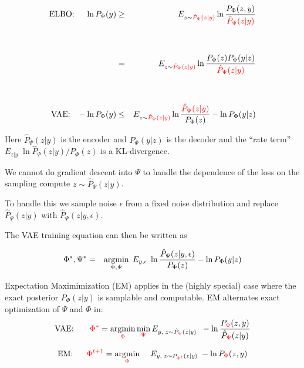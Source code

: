{

{\huge
\begin{eqnarray*}
\mbox{ELBO:}\;\;\;\;\;\ln P_\Phi(y)   &  \geq & E_{z \sim {\color{red} \hat{P}_\Psi(z|y)}} \ln \frac{P_\Phi(z,y)}{{\color{red} \hat{P}_\Psi(z|y)}} \\
  \\
  \\
  & = & E_{z \sim {\color{red} \hat{P}_\Psi(z|y)}} \ln \frac{P_\Phi(z)P_\Phi(y|z)}{{\color{red} \hat{P}_\Psi(z|y)}}\\
  \\
  \\
\mbox{VAE:}\;\;\;- \ln P_\Phi(y)  & \leq & E_{z \sim {\color{red} \hat{P}_\Psi(z|y)}} \ln \frac{{\color{red} \hat{P}_\Psi(z|y)}}{P_\Phi(z)}  - \ln P_\Phi(y|z)
\end{eqnarray*}
}

\vfill
Here $\hat{P}_\Psi(z|y)$ is the encoder and $P_\Phi(y|z)$ is the decoder and the ``rate term'' $ E_{z|y}\;\ln \hat{P}_\Psi(z|y)/P_\Phi(z)$ is a KL-divergence.



We cannot do gradient descent into $\Psi$ to handle the dependence of the loss on the sampling compute $z \sim \hat{P}_\Psi(z|y)$.

\vfill
To handle this we sample noise $\epsilon$ from a fixed noise distribution and replace $\hat{P}_\Psi(z|y)$ with $\hat{P}_\Psi(z|y,\epsilon)$.

\vfill
The VAE training equation can then be written as

\vfill
\begin{eqnarray*}
\Phi^*,\Psi^* & =  & \operatorname*{argmin}_{\Phi,\Psi}\;E_{y,\epsilon}  \;\ln \frac{\hat{P}_\Psi(z|y,\epsilon)}{P_\Phi(z)}  - \ln P_\Phi(y|z)
\end{eqnarray*}



Expectation Maximimization (EM) applies in the (highly special) case where the exact posterior $P_\Phi(z|y)$ is samplable and computable.
EM alternates exact optimization of $\Psi$ and $\Phi$ in:
$$\mbox{VAE:}\;\;\;\;\;\;\; {\color{red} \Phi^*} = \operatorname*{argmin}_{\color{red} \Phi} \min_{\color{red} \Psi} E_{y,\;z \sim \hat{P}_{\color{red} \Psi}(z|y)}\;\;- \ln \frac{P_{\color{red} \Phi}(z,y)}{\hat{P}_{\color{red} \Psi}(z|y)}$$

\vfill
$$\mbox{EM:}\;\;\;\;\;\; {\color{red} \Phi^{t+1}} =  \operatorname*{argmin}_{\color{red} \Phi}\;\;\;\;E_{y,\;z \sim P_{\color{red} \Phi^t}(z|y)}\; - \ln P_{\color{red} \Phi}(z,y)$$

}
